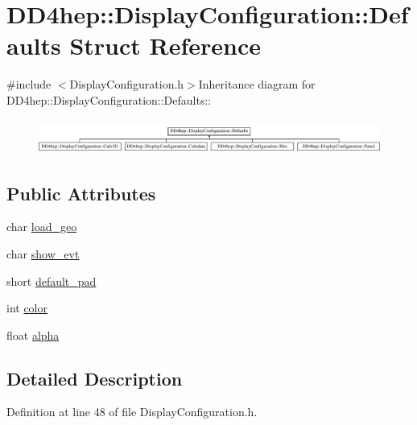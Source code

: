 \hypertarget{struct_d_d4hep_1_1_display_configuration_1_1_defaults}{
\section{DD4hep::DisplayConfiguration::Defaults Struct Reference}
\label{struct_d_d4hep_1_1_display_configuration_1_1_defaults}
}


{\ttfamily \#include $<$DisplayConfiguration.h$>$}Inheritance diagram for DD4hep::DisplayConfiguration::Defaults::\begin{figure}[H]
\begin{center}
\leavevmode
\includegraphics[height=1.13821cm]{struct_d_d4hep_1_1_display_configuration_1_1_defaults}
\end{center}
\end{figure}
\subsection*{Public Attributes}
\begin{DoxyCompactItemize}
\item 
char \hyperlink{struct_d_d4hep_1_1_display_configuration_1_1_defaults_ad70e6ccfad33fb7a2282b01fb4118fc9}{load\_\-geo}
\item 
char \hyperlink{struct_d_d4hep_1_1_display_configuration_1_1_defaults_a63fc69fe802d80627939c1f00d188cde}{show\_\-evt}
\item 
short \hyperlink{struct_d_d4hep_1_1_display_configuration_1_1_defaults_a3c5fed67372178924ac8af2555704f4b}{default\_\-pad}
\item 
int \hyperlink{struct_d_d4hep_1_1_display_configuration_1_1_defaults_a0bf12d67de25954afafe95ab865c624b}{color}
\item 
float \hyperlink{struct_d_d4hep_1_1_display_configuration_1_1_defaults_ac0ef410d85c5a9695d6d6f595b6bd085}{alpha}
\end{DoxyCompactItemize}


\subsection{Detailed Description}


Definition at line 48 of file DisplayConfiguration.h.


